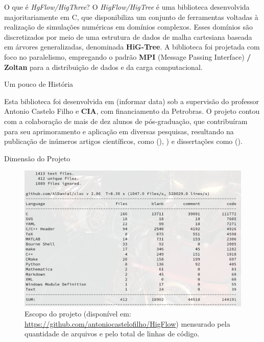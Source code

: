 \documentclass[aspectratio=169,t,xcolor=table]{beamer}
\begin{document}
\begin{frame}{}
	\smaller
	\begin{block}{O que é \textit{HgFlow/HigThree}?}
		\vspace{0.25 cm}
		O \textit{HigFlow/HigTree} é uma biblioteca desenvolvida majoritariamente em C, que disponibiliza um conjunto de ferramentas voltadas à realização de simulações numéricas em domínios complexos. Esses domínios são discretizados por meio de uma estrutura de dados de malha cartesiana baseada em árvores generalizadas, denominada \textbf{HiG-Tree}. A biblioteca foi projetada com foco no paralelismo, empregando o padrão \textbf{MPI} (Message Passing Interface)\textbf{ / Zoltan} para a distribuição de dados e da carga computacional.
	\end{block}
	
	\begin{block}{Um pouco de História}
		\vspace{0.25 cm}
		
		Esta biblioteca foi desenvolvida em (informar data) sob a supervisão do professor Antonio Castelo Filho e \textbf{CIA}, com financiamento da Petrobras. O projeto contou com a colaboração de mais de dez alunos de pós-graduação, que contribuíram para seu aprimoramento e aplicação em diversas pesquisas, resultando na publicação de inúmeros artigos científicos, como  (), ) e dissertações como ().
	\end{block}
\end{frame}

\begin{frame}{\smaller \smaller Dimensão do Projeto}
	
	\begin{figure}
		\vspace{-0.3cm}
		\centering
		\caption{\smaller Escopo do projeto (disponível em: \url{https://github.com/antoniocastelofilho/HigFlow}) mensurado pela quantidade de arquivos e pelo total de linhas de código.}
		\includegraphics[height=0.7\textheight]{imgs/dimencao_do_projeto.png}
	\end{figure}
\end{frame}
\end{document}
